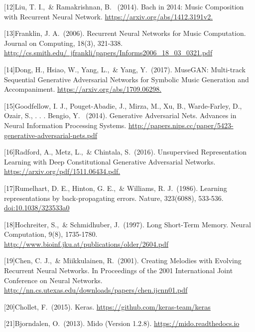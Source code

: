 \documentclass{article}
\begin{document}
[12]Liu, T. I.,\ \& Ramakrishnan, B. \ (2014). Bach in 2014: Music Composition with Recurrent Neural Network. \href{url}{https://arxiv.org/abs/1412.3191v2.}

[13]Franklin, J. A.\ (2006). Recurrent Neural Networks for Music Computation. Journal on Computing, 18(3), 321-338. \href{url}{http://cs.smith.edu/~jfrankli/papers/Informs2006\_18\_03\_0321.pdf}

[14]Dong, H., Hsiao, W., Yang, L.,\ \& Yang, Y.\ (2017). MuseGAN: Multi-track Sequential Generative Adversarial Networks for Symbolic Music Generation and Accompaniment. \href{url}{https://arxiv.org/abs/1709.06298.}

[15]Goodfellow, I. J., Pouget-Abadie, J., Mirza, M., Xu, B., Warde-Farley, D., Ozair, S., . . . Bengio, Y. \ (2014). Generative Adversarial Nets. Advances in Neural Information Processing Systems.  \href{url}{http://papers.nips.cc/paper/5423-generative-adversarial-nets.pdf}

[16]Radford, A., Metz, L.,\ \& Chintala, S.\ (2016). Unsupervised Representation Learning with Deep Constitutional Generative Adversarial Networks. \href{url}{https://arxiv.org/pdf/1511.06434.pdf.}

[17]Rumelhart, D. E., Hinton, G. E.,\ \& Williams, R. J.\ (1986). Learning representations by back-propagating errors. Nature, 323(6088), 533-536.  \href{url}{doi:10.1038/323533a0}

[18]Hochreiter, S.,\ \& Schmidhuber, J.\ (1997). Long Short-Term Memory. Neural Computation, 9(8), 1735-1780. \href{url}{http://www.bioinf.jku.at/publications/older/2604.pdf}

[19]Chen, C. J.,\ \& Miikkulainen, R.\ (2001). Creating Melodies with Evolving Recurrent Neural Networks. In Proceedings of the 2001 International Joint Conference on Neural Networks. \href{url}{http://nn.cs.utexas.edu/downloads/papers/chen.ijcnn01.pdf}

[20]Chollet, F.\ (2015). Keras. \href{url}{https://github.com/keras-team/keras}

[21]Bjorndalen, O.\ (2013). Mido (Version 1.2.8). \href{url}{https://mido.readthedocs.io}
\end{document}
